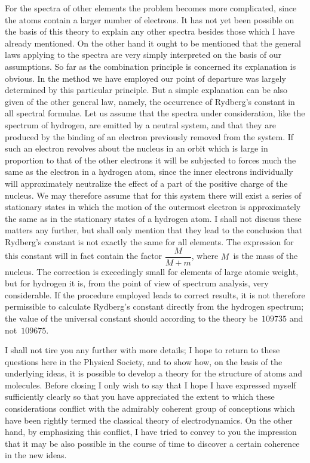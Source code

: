  For the spectra of other elements the problem
becomes more complicated, since the atoms contain a larger
number of electrons. It has not yet been possible on the basis of
this theory to explain any other spectra besides those which I
have already mentioned. On the other hand it ought to be
mentioned that the general laws applying to the spectra are very
simply interpreted on the basis of our assumptions. So far as the
combination principle is concerned its explanation is obvious. In
the method we have employed our point of departure was largely
determined by this particular principle. But a simple explanation
can be also given of the other general law, namely, the occurrence
of Rydberg's constant in all spectral formulae. Let us assume
that the spectra under consideration, like the spectrum of hydrogen,
are emitted by a neutral system, and that they are produced by
the binding of an electron previously removed from the system.
If such an electron revolves about the nucleus in an orbit which
is large in proportion to that of the other electrons it will be
subjected to forces much the same as the electron in a hydrogen
atom, since the inner electrons individually will approximately
neutralize the effect of a part of the positive charge of the nucleus.
We may therefore assume that for this system there will exist a
series of stationary states in which the motion of the outermost
electron is approximately the same as in the stationary states of a
hydrogen atom. I shall not discuss these matters any further,
but shall only mention that they lead to the conclusion that
Rydberg's constant is not exactly the same for all elements.
The expression for this constant will in fact contain the factor
$\dfrac{M}{M + m}$, where $M$~is the mass of the nucleus. The correction is
exceedingly small for elements of large atomic weight, but for
hydrogen it is, from the point of view of spectrum analysis, very
considerable. If the procedure employed leads to correct results, it
is not therefore permissible to calculate Rydberg's constant directly
from the hydrogen spectrum; the value of the universal constant
should according to the theory be~$109735$ and not~$109675$.

I shall not tire you any further with more details; I hope to
return to these questions here in the Physical Society, and to
show how, on the basis of the underlying ideas, it is possible
to develop a theory for the structure of atoms and molecules.
Before closing I only wish to say that I hope I have expressed
myself sufficiently clearly so that you have appreciated the extent
to which these considerations conflict with the admirably coherent
group of conceptions which have been rightly termed the classical
theory of electrodynamics. On the other hand, by emphasizing
this conflict, I have tried to convey to you the impression that it
may be also possible in the course of time to discover a certain
coherence in the new ideas.


